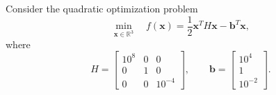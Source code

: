 Consider the quadratic optimization problem
\begin{equation}
\min_{\mathbf{x}\in\mathbb{R}^3}
\quad
f(\mathbf{x})
=
\frac{1}{2}\mathbf{x}^TH\mathbf{x}
-
\mathbf{b}^T\mathbf{x},
\end{equation}
where
\begin{equation}
H=
\begin{bmatrix}
10^8&0&0\\
0&1&0\\
0&0&10^{-4}
\end{bmatrix},
\qquad
\mathbf{b}=
\begin{bmatrix}
10^4\\
1\\
10^{-2}
\end{bmatrix}.
\end{equation}

